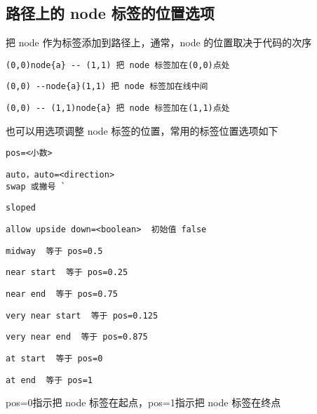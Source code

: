 \documentclass[UTF8]{ctexart}
\begin{document}
\subsection{路径上的 node 标签的位置选项}

把 node 作为标签添加到路径上，通常，node 的位置取决于代码的次序
\begin{lstlisting}
(0,0)node{a} -- (1,1) 把 node 标签加在(0,0)点处
\end{lstlisting}
\begin{lstlisting}
(0,0) --node{a}(1,1) 把 node 标签加在线中间
\end{lstlisting}
\begin{lstlisting}
(0,0) -- (1,1)node{a} 把 node 标签加在(1,1)点处
\end{lstlisting}

也可以用选项调整 node 标签的位置，常用的标签位置选项如下
\begin{lstlisting}
pos=<小数> 
\end{lstlisting}
\begin{lstlisting}
auto，auto=<direction>
swap 或撇号 `
\end{lstlisting}
\begin{lstlisting}
sloped
\end{lstlisting}
\begin{lstlisting}
allow upside down=<boolean>  初始值 false
\end{lstlisting}
\begin{lstlisting}
midway  等于 pos=0.5
\end{lstlisting}
\begin{lstlisting}
near start  等于 pos=0.25
\end{lstlisting}
\begin{lstlisting}
near end  等于 pos=0.75
\end{lstlisting}
\begin{lstlisting}
very near start  等于 pos=0.125
\end{lstlisting}
\begin{lstlisting}
very near end  等于 pos=0.875
\end{lstlisting}
\begin{lstlisting}
at start  等于 pos=0
\end{lstlisting}
\begin{lstlisting}
at end  等于 pos=1
\end{lstlisting}



pos=0指示把 node 标签在起点，pos=1指示把 node 标签在终点\\
\end{document}
